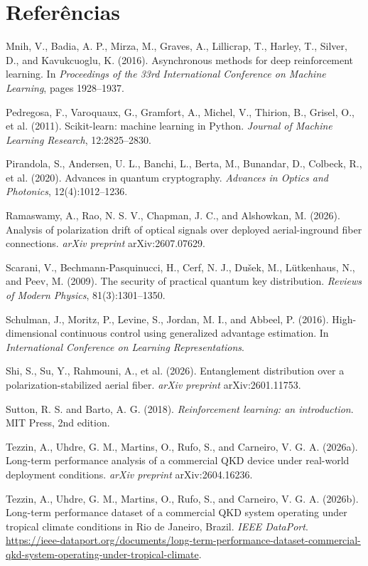 \documentclass[12pt]{article}
\makeatletter
\renewenvironment{thebibliography}[1]{%
  \section*{Refer\^encias}%
  \list{}{\usecounter{enumiv}\let\p@enumiv\@empty%
    \renewcommand\theenumiv{\@arabic\c@enumiv}%
    \setlength{\labelwidth}{0pt}\setlength{\labelsep}{0pt}%
    \setlength{\leftmargin}{1.6em}\setlength{\itemindent}{-1.6em}%
    \setlength{\itemsep}{0.35em}\setlength{\parsep}{0pt}}%
  \small\sloppy\clubpenalty4000\widowpenalty4000%
  \let\@noitemerr\relax}%
 {\endlist}
\makeatother
\begin{document}
\begin{thebibliography}{99}
\bibitem{} Mnih, V., Badia, A. P., Mirza, M., Graves, A., Lillicrap, T., Harley,
T., Silver, D., and Kavukcuoglu, K. (2016). Asynchronous methods for deep
reinforcement learning. In \textit{Proceedings of the 33rd International
Conference on Machine Learning}, pages 1928--1937.

\bibitem{} Pedregosa, F., Varoquaux, G., Gramfort, A., Michel, V., Thirion, B.,
Grisel, O., et al. (2011). Scikit-learn: machine learning in Python.
\textit{Journal of Machine Learning Research}, 12:2825--2830.

\bibitem{} Pirandola, S., Andersen, U. L., Banchi, L., Berta, M., Bunandar, D.,
Colbeck, R., et al. (2020). Advances in quantum cryptography. \textit{Advances in
Optics and Photonics}, 12(4):1012--1236.

\bibitem{} Ramaswamy, A., Rao, N. S. V., Chapman, J. C., and Alshowkan, M. (2026).
Analysis of polarization drift of optical signals over deployed aerial-inground
fiber connections. \textit{arXiv preprint} arXiv:2607.07629.

\bibitem{} Scarani, V., Bechmann-Pasquinucci, H., Cerf, N. J., Dušek, M.,
Lütkenhaus, N., and Peev, M. (2009). The security of practical quantum key
distribution. \textit{Reviews of Modern Physics}, 81(3):1301--1350.

\bibitem{} Schulman, J., Moritz, P., Levine, S., Jordan, M. I., and Abbeel, P.
(2016). High-dimensional continuous control using generalized advantage
estimation. In \textit{International Conference on Learning Representations}.

\bibitem{} Shi, S., Su, Y., Rahmouni, A., et al. (2026). Entanglement distribution
over a polarization-stabilized aerial fiber. \textit{arXiv preprint}
arXiv:2601.11753.

\bibitem{} Sutton, R. S. and Barto, A. G. (2018). \textit{Reinforcement learning:
an introduction}. MIT Press, 2nd edition.

\bibitem{} Tezzin, A., Uhdre, G. M., Martins, O., Rufo, S., and Carneiro, V. G. A.
(2026a). Long-term performance analysis of a commercial QKD device under
real-world deployment conditions. \textit{arXiv preprint} arXiv:2604.16236.

\bibitem{} Tezzin, A., Uhdre, G. M., Martins, O., Rufo, S., and Carneiro, V. G. A.
(2026b). Long-term performance dataset of a commercial QKD system operating under
tropical climate conditions in Rio de Janeiro, Brazil. \textit{IEEE DataPort}.
\url{https://ieee-dataport.org/documents/long-term-performance-dataset-commercial-qkd-system-operating-under-tropical-climate}.


\end{thebibliography}
\end{document}
